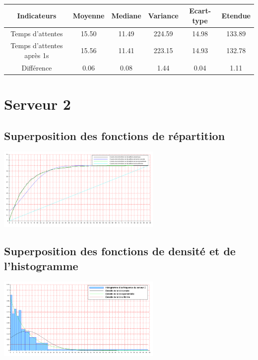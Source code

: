 \documentclass{article}
\begin{document}
\paragraph{}

\begin{center}
\begin{tabular}{|c|c|c|c|c|c|}
  \hline
  Indicateurs & Moyenne & Mediane & Variance & Ecart-type & Etendue \\
  \hline
  Temps d'attentes & 15.50 & 11.49 & 224.59 & 14.98 & 133.89 \\
  Temps d'attentes après 1s & 15.56 & 11.41 & 223.15 & 14.93 & 132.78 \\
  Différence & 0.06 & 0.08 & 1.44 & 0.04 & 1.11 \\
  \hline
\end{tabular}
\end{center}

\section{Serveur 2}

\subsection{Superposition des fonctions de répartition}
\begin{center}
\includegraphics[width=300px]{img/S2_repartitions.png}
\end{center}
\paragraph{}

\subsection{Superposition des fonctions de densité et de l'histogramme}
\begin{center}
\includegraphics[width=300px]{img/S2_densite.png}
\end{center}
\end{document}
